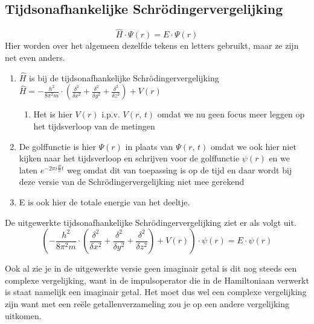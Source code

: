 \documentclass[11pt,fleqn]{book} %
\begin{document}
\subsection{Tijdsonafhankelijke Schrödingervergelijking}
\begin{displaymath}
\hat{H}\cdot \Psi(r)=E\cdot \Psi(r)
\end{displaymath}
Hier worden over het algemeen dezelfde tekens en letters gebruikt, maar ze zijn net even anders.
\begin{enumerate}
\item $\hat{H}$ is bij de tijdsonafhankelijke Schrödingervergelijking $\hat{H}=-\frac{h^2}{8\pi^2m}\cdot \left(\frac{\delta^2}{\delta x^2}+\frac{\delta^2}{\delta y^2}+\frac{\delta^2}{\delta z^2}\right)+V(r)$
\begin{enumerate}
\item Het is hier $V(r)$ i.p.v. $V(r,\,t)$ omdat we nu geen focus meer leggen op het tijdsverloop van de metingen
\end{enumerate}
\item De golffunctie is hier $\Psi(r)$ in plaats van $\Psi(r,\,t)$ omdat we ook hier niet kijken naar het tijdsverloop en schrijven voor de golffunctie $\psi(r)$ en we laten $e^{-2\pi i\frac{E}{h}t}$ weg omdat dit van toepassing is op de tijd en daar wordt bij deze versie van de Schrödingervergelijking niet mee gerekend
\item E is ook hier de totale energie van het deeltje.
\end{enumerate}

De uitgewerkte tijdsonafhankelijke Schrödingervergelijking ziet er als volgt uit.
\begin{displaymath}
\left(-\frac{h^2}{8\pi^2m}\cdot \left(\frac{\delta^2}{\delta x^2}+\frac{\delta^2}{\delta y^2}+\frac{\delta^2}{\delta z^2}\right)+V(r)\right)\cdot \psi(r)=E\cdot \psi(r)
\end{displaymath}

Ook al zie je in de uitgewerkte versie geen imaginair getal is dit nog steeds een complexe vergelijking, want in de impulsoperator die in de Hamiltoniaan verwerkt is staat namelijk een imaginair getal. Het moet dus wel een complexe vergelijking zijn want met een reële getallenverzameling zou je op een andere vergelijking uitkomen.
\end{document}
